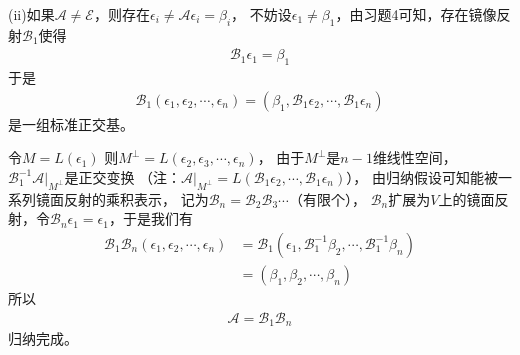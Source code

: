 \documentclass{article}
\begin{document}
(ii)如果$\mathscr{A} \neq \mathscr{E}$，则存在$\epsilon_i \neq \mathscr{A} \epsilon_i = \beta_i$，
不妨设$\epsilon_1 \neq \beta_1$，由习题4可知，存在镜像反射$\mathscr{B}_1$使得
\begin{align*}
  \mathscr{B}_1 \epsilon_1 = \beta_1
\end{align*}
于是
\begin{align*}
  \mathscr{B}_1(\epsilon_1, \epsilon_2, \cdots, \epsilon_n)
  = (\beta_1, \mathscr{B}_1 \epsilon_2, \cdots, \mathscr{B}_1 \epsilon_n)
\end{align*}
是一组标准正交基。

令$M = L(\epsilon_1)$
则$M^{\bot} = L(\epsilon_2, \epsilon_3, \cdots, \epsilon_n)$，
由于$M^{\bot}$是$n - 1$维线性空间，
$\mathscr{B}_1^{-1}\mathscr{A}|_{M^{\bot}}$是正交变换
（注：$\mathscr{A}|_{M^{\bot}} = L(\mathscr{B}_1 \epsilon_2, \cdots, \mathscr{B}_1 \epsilon_n)$），
由归纳假设可知能被一系列镜面反射的乘积表示，
记为$\mathscr{B}_{n} = \mathscr{B}_{2} \mathscr{B}_{3} \cdots$（有限个），
$\mathscr{B}_{n}$扩展为$V$上的镜面反射，令$\mathscr{B}_n \epsilon_1 = \epsilon_1$，于是我们有
\begin{align*}
  \mathscr{B}_1 \mathscr{B}_n (\epsilon_1, \epsilon_2, \cdots, \epsilon_n)
  & = \mathscr{B}_1(\epsilon_1, \mathscr{B}^{-1}_1 \beta_2, \cdots, \mathscr{B}^{-1}_1 \beta_n) \\
  & = (\beta_1, \beta_2, \cdots, \beta_n)
\end{align*}
所以
\begin{align*}
  \mathscr{A} = \mathscr{B}_1 \mathscr{B}_n
\end{align*}
归纳完成。
\end{document}
